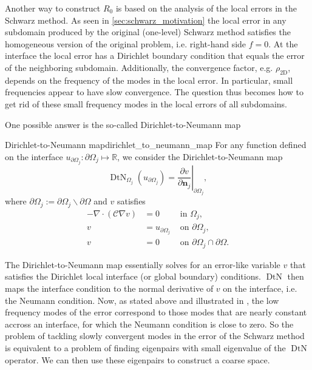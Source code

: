 Another way to construct $R_0$ is based on the analysis of the local errors in the Schwarz method. As seen in \cref{sec:schwarz_motivation} the local error in any subdomain produced by the original (one-level) Schwarz method satisfies the homogeneous version of the original problem, i.e. right-hand side $f = 0$. At the interface the local error has a Dirichlet boundary condition that equals the error of the neighboring subdomain. Additionally, the convergence factor, e.g. $\rho_{\text{2D}}$, depends on the frequency of the modes in the local error. In particular, small frequencies appear to have slow convergence. The question thus becomes how to get rid of these small frequency modes in the local errors of all subdomains.

One possible answer is the so-called Dirichlet-to-Neumann map \cite[Definition 5.1]{schwarz_methods_Dolean_2015}
\begin{fancydef}{Dirichlet-to-Neumann map}{dirichlet_to_neumann_map}
  For any function defined on the interface $u_{\partial\Omega_j}: \partial\Omega_j \mapsto \mathbb{R}$, we consider the Dirichlet-to-Neumann map
  \[
    \operatorname{DtN}_{\Omega_j}\left(u_{\partial\Omega_j}\right)=\left.\frac{\partial v}{\partial \mathbf{n}_j}\right|_{\partial\Omega_j},
  \]
  where $\partial\Omega_j:=\partial \Omega_j \backslash \partial \Omega$ and $v$ satisfies
  \begin{equation}
    \begin{aligned}
      -\nabla\cdot\left(\mathcal{C}\nabla v\right) & =0                    & \text { in } \Omega_j,                               \\
      v                                            & =u_{\partial\Omega_j} & \text { on } \partial\Omega_j,                       \\
      v                                            & =0                    & \text { on } \partial \Omega_j \cap \partial \Omega.
    \end{aligned}
    \label{eq:dirichlet_to_neumann_map_subproblem}
  \end{equation}
\end{fancydef}

The Dirichlet-to-Neumann map essentially solves for an error-like variable $v$ that satisfies the Dirichlet local interface (or global boundary) conditions. $\operatorname{DtN}$ then maps the interface condition to the normal derivative of $v$ on the interface, i.e. the Neumann condition. Now, as stated above and illustrated in \cite[Figure 5.2]{schwarz_methods_Dolean_2015}, the low frequency modes of the error correspond to those modes that are nearly constant accross an interface, for which the Neumann condition is close to zero. So the problem of tackling slowly convergent modes in the error of the Schwarz method is equivalent to a problem of finding eigenpairs with small eigenvalue of the $\operatorname{DtN}$ operator. We can then use these eigenpairs to construct a coarse space.

